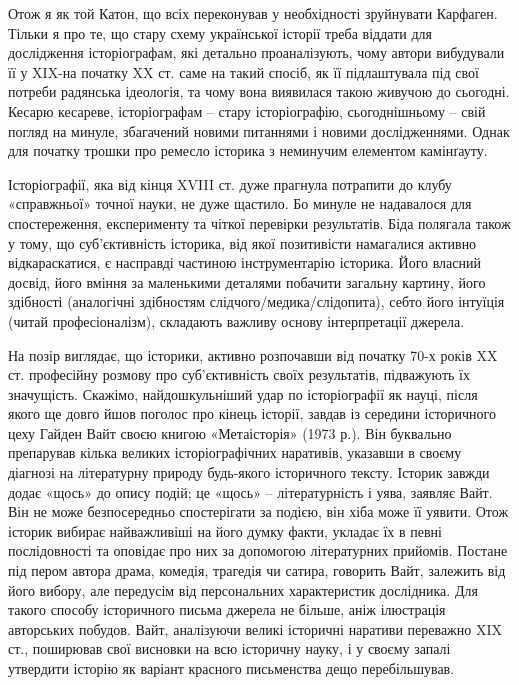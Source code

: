 Отож я як той Катон, що всіх переконував у необхідності зруйнувати Карфаген.
Тільки я  про те, що стару схему української історії треба віддати для
дослідження історіографам, які детально проаналізують, чому автори вибудували
її у XIX-на початку XX ст. саме на такий спосіб, як її підлаштувала під свої
потреби радянська ідеологія, та чому вона виявилася такою живучою до сьогодні.
Кесарю кесареве, історіографам – стару історіографію, сьогоднішньому – свій
погляд на минуле, збагачений новими питаннями і новими дослідженнями. Однак для
початку трошки про ремесло історика з неминучим елементом камінґауту. 

Історіографії, яка від кінця XVIII ст. дуже прагнула потрапити до клубу
«справжньої» точної науки, не дуже щастило. Бо минуле не надавалося для
спостереження, експерименту та чіткої перевірки результатів. Біда полягала
також у тому, що суб’єктивність історика, від якої позитивісти намагалися
активно відкараскатися, є насправді частиною інструментарію історика. Його
власний досвід, його вміння за маленькими деталями побачити загальну картину,
його здібності (аналогічні здібностям слідчого/медика/слідопита), себто його
інтуїція (читай професіоналізм), складають важливу основу інтерпретації
джерела. 

На позір виглядає, що історики, активно розпочавши від початку 70-х років XX
ст. професійну розмову про суб’єктивність своїх результатів, підважують їх
значущість.  Скажімо, найдошкульніший удар по історіографії як науці, після
якого ще довго йшов поголос про кінець історії, завдав із середини історичного
цеху Гайден Вайт своєю книгою «Метаісторія» (1973 р.). Він буквально препарував
кілька великих історіографічних наративів, указавши в своєму діагнозі на
літературну природу будь-якого історичного тексту. Історик завжди додає «щось»
до опису подій; це «щось» – літературність і уява, заявляє Вайт. Він не може
безпосередньо спостерігати за подією, він хіба може її уявити. Отож історик
вибирає найважливіші на його думку факти, укладає їх в певні послідовності та
оповідає про них за допомогою літературних прийомів. Постане під пером автора
драма, комедія, трагедія чи сатира, говорить Вайт, залежить від його вибору,
але передусім від персональних характеристик дослідника. Для такого способу
історичного письма джерела не більше, аніж ілюстрація авторських побудов. Вайт,
аналізуючи великі історичні наративи переважно XIX ст., поширював свої висновки
на всю історичну науку, і у своєму запалі утвердити історію як варіант красного
письменства дещо перебільшував. 

